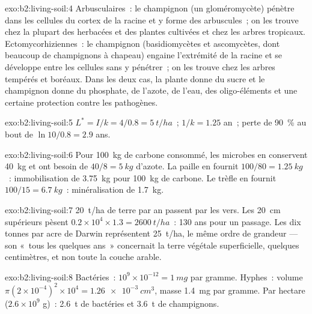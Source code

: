 \begin{solution}{exo:b2:living-soil:4}
Arbusculaires~: le champignon (un gloméromycète) pénètre dans les
cellules du cortex de la racine et y forme des arbuscules~; on les trouve
chez la plupart des herbacées et des plantes cultivées et chez les arbres
tropicaux. Ectomycorhiziennes~: le champignon (basidiomycètes et
ascomycètes, dont beaucoup de champignons à chapeau) engaine l'extrémité
de la racine et se développe entre les cellules sans y pénétrer~; on les
trouve chez les arbres tempérés et boréaux. Dans les deux cas, la plante
donne du sucre et le champignon donne du phosphate, de l'azote, de l'eau,
des oligo-éléments et une certaine protection contre les pathogènes.
\end{solution}

\begin{solution}{exo:b2:living-soil:5}
$L^{*} = I/k = 4/0.8 = \qty{5}{t/ha}$~;  $1/k = 1.25$
an~; perte de \qty{90}{\%} au bout de $\ln 10/0.8 = 2.9$ ans.
\end{solution}

\begin{solution}{exo:b2:living-soil:6}
Pour \qty{100}{kg} de carbone consommé, les microbes en conservent
\qty{40}{kg} et ont besoin de $40/8 = \qty{5}{kg}$ d'azote. La paille en
fournit $100/80 =
\qty{1.25}{kg}$~: immobilisation de \qty{3.75}{kg} pour \qty{100}{kg}
de carbone. Le trèfle en fournit $100/15 = \qty{6.7}{kg}$~: minéralisation
de \qty{1.7}{kg}.
\end{solution}

\begin{solution}{exo:b2:living-soil:7}
\qty{20}{t/ha} de terre par an passent par les vers. Les \qty{20}{cm}
supérieurs pèsent $0.2\times 10^{4}\times 1.3 = \qty{2600}{t/ha}$~:
130 ans pour un passage. Les dix tonnes par acre de Darwin représentent
\qty{25}{t/ha}, le même ordre de grandeur --- son «~tous les quelques ans~»
concernait la terre végétale superficielle, quelques centimètres, et non
toute la couche arable.
\end{solution}

\begin{solution}{exo:b2:living-soil:8}
Bactéries~: $10^{9}\times 10^{-12} = \qty{1}{mg}$ par gramme. Hyphes~:
volume $\pi(2\times 10^{-4})^{2}\times 10^{4} = \qty{1.26e-3}{cm^3}$,
masse \qty{1.4}{mg} par gramme. Par hectare ($2.6\times 10^{9}$ g)~:
\qty{2.6}{t} de bactéries et \qty{3.6}{t} de champignons.
\end{solution}

